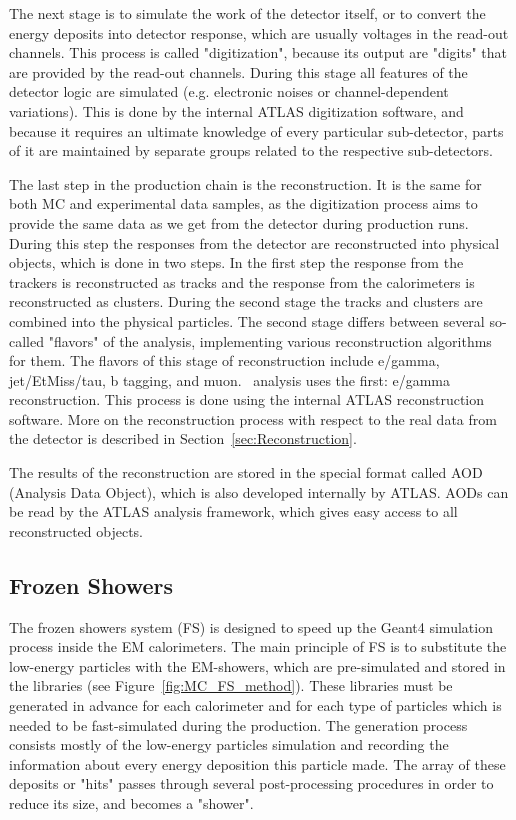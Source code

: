 The next stage is to simulate the work of the detector itself, or to convert the energy deposits into detector response, which are usually voltages in the read-out channels. This process is called "digitization", because its output are "digits" that are provided by the read-out channels. During this stage all features of the detector logic are simulated (e.g. electronic noises or channel-dependent variations). This is done by the internal ATLAS digitization software, and because it requires an ultimate knowledge of every particular sub-detector, parts of it are maintained by separate groups related to the respective sub-detectors.

The last step in the production chain is the reconstruction. It is the same for both MC and experimental data samples, as the digitization process aims to provide the same data as we get from the detector during production runs. During this step the responses from the detector are reconstructed into physical objects, which is done in two steps. In the first step the response from the trackers is reconstructed as tracks and the response from the calorimeters is reconstructed as clusters. During the second stage the tracks and clusters are combined into the physical particles. The second stage differs between several so-called "flavors" of the analysis, implementing various reconstruction algorithms for them. The flavors of this stage of reconstruction include e/gamma, jet/EtMiss/tau, b tagging, and muon. \Zee\ analysis uses the first: e/gamma reconstruction. This process is done using the internal ATLAS reconstruction software. More on the reconstruction process with respect to the real data from the detector is described in Section~\ref{sec:Reconstruction}.

The results of the reconstruction are stored in the special format called AOD (Analysis Data Object), which is also developed internally by ATLAS. AODs can be read by the ATLAS analysis framework, which gives easy access to all reconstructed objects.

\subsection{Frozen Showers}
\label{sec:MC_FS}
The frozen showers system (FS) is designed to speed up the Geant4 simulation process inside the EM calorimeters. The main principle of FS is to substitute the low-energy particles with the EM-showers, which are pre-simulated and stored in the libraries (see Figure~\ref{fig:MC_FS_method}). These libraries must be generated in advance for each calorimeter and for each type of particles which is needed to be fast-simulated during the production. The generation process consists mostly of the low-energy particles simulation and recording the information about every energy deposition this particle made. The array of these deposits or "hits" passes through several post-processing procedures in order to reduce its size, and becomes a "shower".

